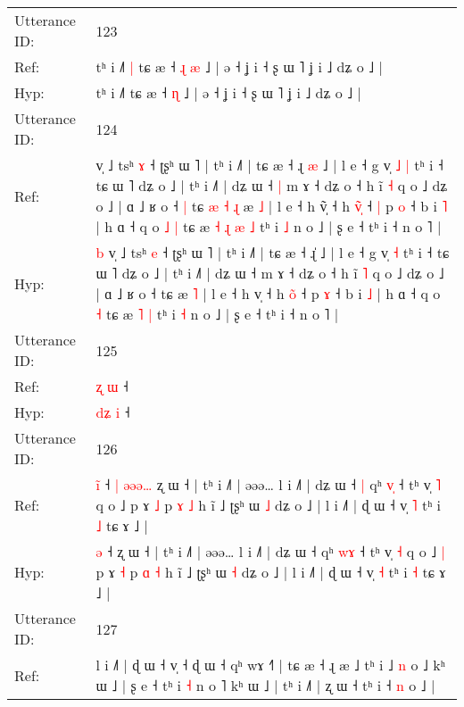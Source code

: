 \documentclass[10pt]{article}
\DeclareRobustCommand{\hl}[1]{{\textcolor{red}{#1}}}
\begin{document}
\begin{longtable}{ll}
 \\
\midrule
Utterance ID: & 123 \\
Ref: & tʰ i ˩˥\hl{ }\hl{|} tɕ æ ˧\hl{ }\hl{ɻ} \hl{æ} ˩ | ə ˧ ʝ i ˧ ʂ ɯ ˥ ʝ i ˩ dʑ o ˩ |
 \\
Hyp: & tʰ i ˩˥\hl{}\hl{} tɕ æ ˧\hl{}\hl{} \hl{ɳ} ˩ | ə ˧ ʝ i ˧ ʂ ɯ ˥ ʝ i ˩ dʑ o ˩ |
 \\
\midrule
Utterance ID: & 124 \\
Ref: & \hl{}\hl{}v̩ ˩ tsʰ \hl{ɤ} ˧ ʈʂʰ ɯ ˥ | tʰ i ˩˥ | tɕ æ ˧ ɻ\hl{ }\hl{æ} ˩ | l e ˧ g v̩\hl{ }\hl{˩} \hl{|} tʰ i ˧ tɕ ɯ ˥ dʑ o ˩ | tʰ i ˩˥ | dʑ ɯ ˧\hl{ }\hl{|} m ɤ ˧ dʑ o ˧ h ĩ \hl{˧} q o ˩ dʑ o ˩ | ɑ ˩ ʁ o ˧\hl{ }\hl{|} tɕ\hl{ }\hl{æ}\hl{ }\hl{˧}\hl{ }\hl{ɻ} æ \hl{˩} | l e ˧ h v\hl{̃}̩ ˧ h \hl{v}̃\hl{̩} ˧\hl{ }\hl{|} p \hl{o} ˧ b i \hl{˥} | h ɑ ˧ q o\hl{ }\hl{˩} \hl{|} tɕ æ\hl{ }\hl{˧}\hl{ }\hl{ɻ} \hl{æ} \hl{˩} tʰ i \hl{˩} n o ˩ | ʂ e ˧ tʰ i ˧ n o ˥ |
 \\
Hyp: & \hl{b}\hl{ }v̩ ˩ tsʰ \hl{e} ˧ ʈʂʰ ɯ ˥ | tʰ i ˩˥ | tɕ æ ˧ ɻ\hl{}\hl{̍} ˩ | l e ˧ g v̩\hl{}\hl{} \hl{˧} tʰ i ˧ tɕ ɯ ˥ dʑ o ˩ | tʰ i ˩˥ | dʑ ɯ ˧\hl{}\hl{} m ɤ ˧ dʑ o ˧ h ĩ \hl{˥} q o ˩ dʑ o ˩ | ɑ ˩ ʁ o ˧\hl{}\hl{} tɕ\hl{}\hl{}\hl{}\hl{}\hl{}\hl{} æ \hl{˥} | l e ˧ h v\hl{}̩ ˧ h \hl{o}̃\hl{} ˧\hl{}\hl{} p \hl{ɤ} ˧ b i \hl{˩} | h ɑ ˧ q o\hl{}\hl{} \hl{˧} tɕ æ\hl{}\hl{}\hl{}\hl{} \hl{˥} \hl{|} tʰ i \hl{˧} n o ˩ | ʂ e ˧ tʰ i ˧ n o ˥ |
 \\
\midrule
Utterance ID: & 125 \\
Ref: & \hl{}\hl{ʐ} \hl{ɯ} ˧
 \\
Hyp: & \hl{d}\hl{ʑ} \hl{i} ˧
 \\
\midrule
Utterance ID: & 126 \\
Ref: & \hl{i}\hl{̃} ˧\hl{ }\hl{|}\hl{ }\hl{ə}\hl{ə}\hl{ə}\hl{…} ʐ ɯ ˧ | tʰ i ˩˥ | əəə… l i ˩˥ | dʑ ɯ ˧\hl{ }\hl{|} qʰ \hl{v}\hl{̩} ˧ tʰ v̩ \hl{˥} q o ˩\hl{}\hl{} p ɤ \hl{˩} p \hl{ɤ} \hl{˩} h ĩ ˩ ʈʂʰ ɯ \hl{˩} dʑ o ˩ | l i ˩˥ | ɖ ɯ ˧ v̩ \hl{˥} tʰ i \hl{˩} tɕ ɤ ˩ |
 \\
Hyp: & \hl{}\hl{ə} ˧\hl{}\hl{}\hl{}\hl{}\hl{}\hl{}\hl{} ʐ ɯ ˧ | tʰ i ˩˥ | əəə… l i ˩˥ | dʑ ɯ ˧\hl{}\hl{} qʰ \hl{w}\hl{ɤ} ˧ tʰ v̩ \hl{˧} q o ˩\hl{ }\hl{|} p ɤ \hl{˧} p \hl{ɑ} \hl{˧} h ĩ ˩ ʈʂʰ ɯ \hl{˧} dʑ o ˩ | l i ˩˥ | ɖ ɯ ˧ v̩ \hl{˧} tʰ i \hl{˧} tɕ ɤ ˩ |
 \\
\midrule
Utterance ID: & 127 \\
Ref: & l i ˩˥ | ɖ ɯ ˧ v̩ ˧ ɖ ɯ ˧ qʰ wɤ ˧˥ | tɕ æ ˧ ɻ æ ˩\hl{}\hl{} tʰ i ˩ \hl{n} o ˩ kʰ ɯ ˩ | ʂ e ˧ tʰ i\hl{}\hl{}\hl{} \hl{˧} n o ˥ kʰ ɯ ˩ | tʰ i ˩˥ | ʐ ɯ ˧ tʰ i ˧ \hl{n} o ˩ |
 \\

\end{longtable}
\end{document}
